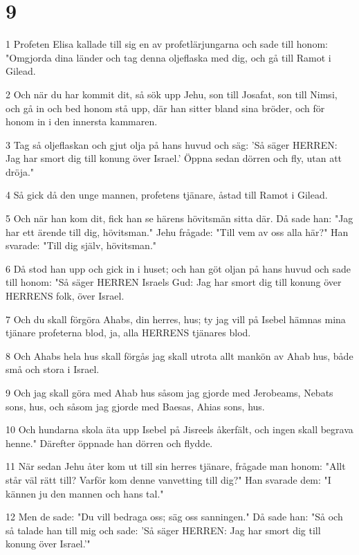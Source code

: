 \chapter{9}

\par 1 Profeten Elisa kallade till sig en av profetlärjungarna och sade till honom: "Omgjorda dina länder och tag denna oljeflaska med dig, och gå till Ramot i Gilead.
\par 2 Och när du har kommit dit, så sök upp Jehu, son till Josafat, son till Nimsi, och gå in och bed honom stå upp, där han sitter bland sina bröder, och för honom in i den innersta kammaren.
\par 3 Tag så oljeflaskan och gjut olja på hans huvud och säg: 'Så säger HERREN: Jag har smort dig till konung över Israel.' Öppna sedan dörren och fly, utan att dröja."
\par 4 Så gick då den unge mannen, profetens tjänare, åstad till Ramot i Gilead.
\par 5 Och när han kom dit, fick han se härens hövitsmän sitta där. Då sade han: "Jag har ett ärende till dig, hövitsman." Jehu frågade: "Till vem av oss alla här?" Han svarade: "Till dig själv, hövitsman."
\par 6 Då stod han upp och gick in i huset; och han göt oljan på hans huvud och sade till honom: "Så säger HERREN Israels Gud: Jag har smort dig till konung över HERRENS folk, över Israel.
\par 7 Och du skall förgöra Ahabs, din herres, hus; ty jag vill på Isebel hämnas mina tjänare profeterna blod, ja, alla HERRENS tjänares blod.
\par 8 Och Ahabs hela hus skall förgås jag skall utrota allt mankön av Ahab hus, både små och stora i Israel.
\par 9 Och jag skall göra med Ahab hus såsom jag gjorde med Jerobeams, Nebats sons, hus, och såsom jag gjorde med Baesas, Ahias sons, hus.
\par 10 Och hundarna skola äta upp Isebel på Jisreels åkerfält, och ingen skall begrava henne." Därefter öppnade han dörren och flydde.
\par 11 När sedan Jehu åter kom ut till sin herres tjänare, frågade man honom: "Allt står väl rätt till? Varför kom denne vanvetting till dig?" Han svarade dem: "I kännen ju den mannen och hans tal."
\par 12 Men de sade: "Du vill bedraga oss; säg oss sanningen." Då sade han: "Så och så talade han till mig och sade: 'Så säger HERREN: Jag har smort dig till konung över Israel.'"
